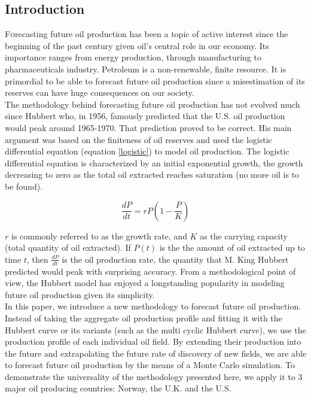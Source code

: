 \documentclass[twoside]{article}
\begin{document}
\begin{multicols}{2} %

\section{Introduction}

\lettrine[nindent=0em,lines=3]
Forecasting future oil production has been a topic of active interest since the beginning of the past century given oil's central role in our economy. Its importance ranges from energy production, through manufacturing to pharmaceuticals industry. Petroleum is a non-renewable, finite resource.  It is primordial to be able to forecast future oil production since a misestimation of its reserves can have huge consequences on our society. \\
The methodology behind forecasting future oil production has not evolved much since Hubbert who, in 1956, famously predicted that the U.S. oil production would peak around 1965-1970. That prediction proved to be correct. His main argument was based on the finiteness of oil reserves and used the logistic differential equation  (equation \ref{logistic}) to model oil production. The logistic differential equation is characterized by an initial exponential growth, the growth decreasing to zero as the total oil extracted reaches saturation (no more oil is to be found).

\begin{equation} \label{logistic}
\frac{dP}{dt} = r P \left( 1 - \frac{P}{K} \right)
\end{equation}

\noindent $r$ is commonly referred to as the growth rate, and $K$ as the carrying capacity (total quantity of oil extracted). If $P(t)$ is the the amount of oil extracted up to time $t$, then $\frac{dP}{dt}$ is the oil production rate, the quantity that M. King Hubbert predicted would peak with surprising accuracy. From a methodological point of view, the Hubbert model has enjoyed a longstanding popularity in modeling future oil production given its simplicity. \\
\noindent In this paper, we introduce a new methodology to forecast future oil production. Instead of taking the aggregate oil production profile and fitting it with the Hubbert curve or its variants (such as the multi cyclic Hubbert curve), we use the production profile of each individual oil field. By extending their production into the future and extrapolating the future rate of discovery of new fields, we are able to forecast future oil production by the means of a Monte Carlo simulation. To demonstrate the universality of the methodology presented here, we  apply it to 3 major oil producing countries: Norway, the U.K. and the U.S.


\end{multicols}
\end{document}
